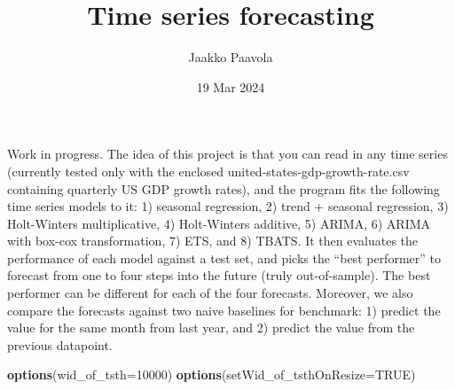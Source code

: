 \documentclass[
]{article}
\title{Time series forecasting}
\author{Jaakko Paavola}
\date{19 Mar 2024}
\newenvironment{Shaded}{\begin{snugshade}}{\end{snugshade}}
\newcommand{\AttributeTok}[1]{\textcolor[rgb]{0.13,0.29,0.53}{#1}}
\newcommand{\ConstantTok}[1]{\textcolor[rgb]{0.56,0.35,0.01}{#1}}
\newcommand{\DecValTok}[1]{\textcolor[rgb]{0.00,0.00,0.81}{#1}}
\newcommand{\FunctionTok}[1]{\textcolor[rgb]{0.13,0.29,0.53}{\textbf{#1}}}
\newcommand{\NormalTok}[1]{#1}
\begin{document}
\maketitle

Work in progress. The idea of this project is that you can read in any
time series (currently tested only with the enclosed
united-states-gdp-growth-rate.csv containing quarterly US GDP growth
rates), and the program fits the following time series models to it: 1)
seasonal regression, 2) trend + seasonal regression, 3) Holt-Winters
multiplicative, 4) Holt-Winters additive, 5) ARIMA, 6) ARIMA with
box-cox transformation, 7) ETS, and 8) TBATS. It then evaluates the
performance of each model against a test set, and picks the ``best
performer'' to forecast from one to four steps into the future (truly
out-of-sample). The best performer can be different for each of the four
forecasts. Moreover, we also compare the forecasts against two naive
baselines for benchmark: 1) predict the value for the same month from
last year, and 2) predict the value from the previous datapoint.

\begin{Shaded}
\begin{Highlighting}[]
\FunctionTok{options}\NormalTok{(}\AttributeTok{wid\_of\_tsth=}\DecValTok{10000}\NormalTok{)}
\FunctionTok{options}\NormalTok{(}\AttributeTok{setWid\_of\_tsthOnResize=}\ConstantTok{TRUE}\NormalTok{)}
\end{Highlighting}
\end{Shaded}
\end{document}
